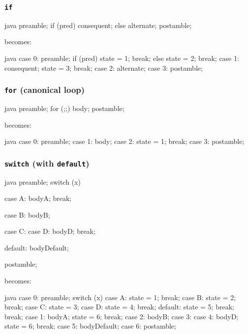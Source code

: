 \documentclass[journal,a4paper]{IEEEtran}
\begin{document}
\subsubsection{\texttt{if}}

\begin{pygmented}{java}
preamble;
if (pred) {
    consequent;
} else {
    alternate;
}
postamble;
\end{pygmented}

becomes:

\begin{pygmented}{java}
case 0:
    preamble;
    if (pred) {
        state = 1;
        break;
    } else {
        state = 2;
        break;
    }
case 1:
    consequent;
    state = 3;
    break;
case 2:
    alternate;
case 3:
    postamble;
\end{pygmented}

\subsubsection{\texttt{for} (canonical loop)}

\begin{pygmented}{java}
preamble;
for (;;) {
    body;
}
postamble;
\end{pygmented}

becomes:

\begin{pygmented}{java}
case 0:
    preamble;
case 1:
    body;
case 2:
    state = 1;
    break;
case 3:
    postamble;
\end{pygmented}

\subsubsection{\texttt{switch} (with \texttt{default})}

\begin{pygmented}{java}
preamble;
switch (x) {
    case A:
        bodyA;
        break;

    case B:
        bodyB;

    case C:
    case D:
        bodyD;
        break;

    default:
        bodyDefault;
}
postamble;
\end{pygmented}

becomes:

\begin{pygmented}{java}
case 0:
    preamble;
    switch (x) {
        case A:
            state = 1;
            break;
        case B:
            state = 2;
            break;
        case C:
            state = 3;
        case D:
            state = 4;
            break;
        default:
            state = 5;
            break;
    }
    break;
case 1:
    bodyA;
    state = 6;
    break;
case 2:
    bodyB;
case 3:
case 4:
    bodyD;
    state = 6;
    break;
case 5:
    bodyDefault;
case 6:
    postamble;
\end{pygmented}
\end{document}
